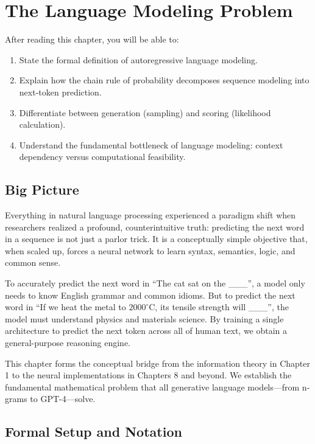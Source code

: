 \chapter{The Language Modeling Problem}
\label{ch:06}

\begin{keyinsight}
After reading this chapter, you will be able to:
\begin{enumerate}
  \item State the formal definition of autoregressive language modeling.
  \item Explain how the chain rule of probability decomposes sequence modeling into next-token prediction.
  \item Differentiate between generation (sampling) and scoring (likelihood calculation).
  \item Understand the fundamental bottleneck of language modeling: context dependency versus computational feasibility.
\end{enumerate}
\end{keyinsight}

\section{Big Picture}
\label{ch:06:sec:big_picture}

Everything in natural language processing experienced a paradigm shift when researchers realized a profound, counterintuitive truth: predicting the next word in a sequence is not just a parlor trick. It is a conceptually simple objective that, when scaled up, forces a neural network to learn syntax, semantics, logic, and common sense. 

To accurately predict the next word in ``The cat sat on the \_\_\_'', a model only needs to know English grammar and common idioms. But to predict the next word in ``If we heat the metal to $2000^\circ$C, its tensile strength will \_\_\_'', the model must understand physics and materials science. By training a single architecture to predict the next token across all of human text, we obtain a general-purpose reasoning engine.

This chapter forms the conceptual bridge from the information theory in Chapter 1 to the neural implementations in Chapters 8 and beyond. We establish the fundamental mathematical problem that all generative language models---from n-grams to GPT-4---solve.

\section{Formal Setup and Notation}
\label{ch:06:sec:setup}

